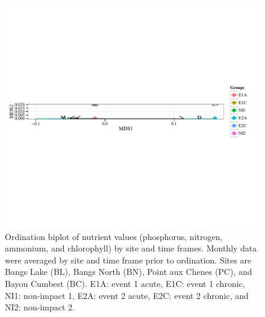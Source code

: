 \documentclass[letterpaper,12pt]{article}\usepackage[]{graphicx}\usepackage[]{color}
\makeatletter
\def\maxwidth{ %
  \ifdim\Gin@nat@width>\linewidth
    \linewidth
  \else
    \Gin@nat@width
  \fi
}
\makeatother
\begin{document}
\begin{figure}[!ht]

{\centering \includegraphics[width=\maxwidth]{figs/ordfig-1} 

}

\caption[Ordination biplot of nutrient values (phosphorus, nitrogen, ammonium, and chlorophyll) by site and time frames]{Ordination biplot of nutrient values (phosphorus, nitrogen, ammonium, and chlorophyll) by site and time frames. Monthly data were averaged by site and time frame prior to ordination.  Sites are Bangs Lake (BL), Bangs North (BN), Point aux Chenes (PC), and Bayou Cumbest (BC). E1A: event 1 acute, E1C: event 1 chronic, NI1: non-impact 1, E2A: event 2 acute, E2C: event 2 chronic, and NI2: non-impact 2.}\label{fig:ordfig}
\end{figure}


\clearpage
\end{document}
